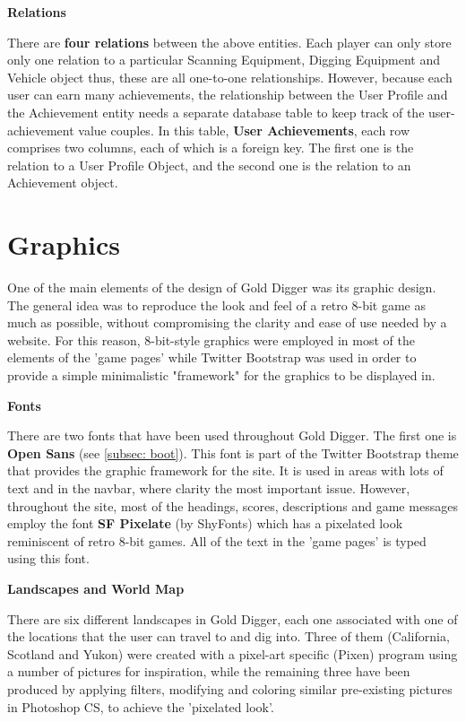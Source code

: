 \documentclass{mproj}
\begin{document}
\textbf{Relations}

There are \textbf{four relations} between the above entities. Each player can only store only one relation to a particular Scanning Equipment, Digging Equipment and Vehicle object thus, these are all one-to-one relationships. However, because each user can earn many achievements, the relationship between the User Profile and the Achievement entity needs a separate database table to keep track of the user-achievement value couples. In this table, \textbf{User Achievements}, each row comprises two columns, each of which is a foreign key. The first one is the relation to a User Profile Object, and the second one is the relation to an Achievement object.   

\section{Graphics}

One of the main elements of the design of Gold Digger was its graphic design. The general idea was to reproduce the look and feel of a retro 8-bit game as much as possible, without compromising the clarity and ease of use needed by a website. For this reason, 8-bit-style graphics were employed in most of the elements of the 'game pages' while Twitter Bootstrap was used in order to provide a simple minimalistic "framework" for the graphics to be displayed in. 

\textbf{Fonts}

There are two fonts that have been used throughout Gold Digger. The first one is \textbf{Open Sans} (see \ref{subsec: boot}). This font is part of the Twitter Bootstrap theme that provides the graphic framework for the site. It is used in areas with lots of text and in the navbar, where clarity the most important issue. However, throughout the site, most of the headings, scores, descriptions and game messages employ the font \textbf{SF Pixelate} (by ShyFonts) which has a pixelated look reminiscent of retro 8-bit games. All of the text in the 'game pages' is typed using this font. 

\textbf{Landscapes and World Map}

There are six different landscapes in Gold Digger, each one associated with one of the locations that the user can travel to and dig into. Three of them (California, Scotland and Yukon) were created with a pixel-art specific (Pixen) program using a number of pictures for inspiration, while the remaining three have been produced by applying filters, modifying and coloring similar pre-existing pictures in Photoshop CS, to achieve the 'pixelated look'. 
\end{document}
